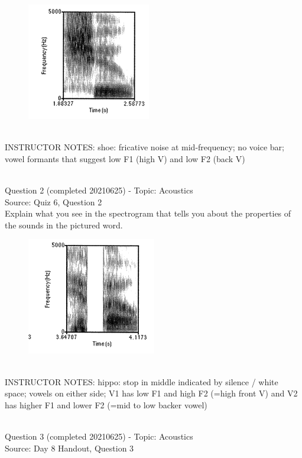 \documentclass[12pt]{article}
\begin{document}
\begin{figure}[H]
\includegraphics{../images/spectrogram_shoe.png}
\end{figure}

~\\
INSTRUCTOR NOTES: shoe: fricative noise at mid-frequency; no voice bar; vowel formants that suggest low F1 (high V) and low F2 (back V)


~\\

{\large Question 2} (completed 20210625) - Topic: Acoustics\\
Source: Quiz 6, Question 2\\

Explain what you see in the spectrogram that tells you about the properties of the sounds in the pictured word.\\

\begin{figure}[H]
\includegraphics{../images/spectrogram_hippo.png}
\end{figure}

~\\
INSTRUCTOR NOTES: hippo: stop in middle indicated by silence / white space; vowels on either side; V1 has low F1 and high F2 (=high front V) and V2 has higher F1 and lower F2 (=mid to low backer vowel)


~\\

{\large Question 3} (completed 20210625) - Topic: Acoustics\\
Source: Day 8 Handout, Question 3\\
\end{document}

